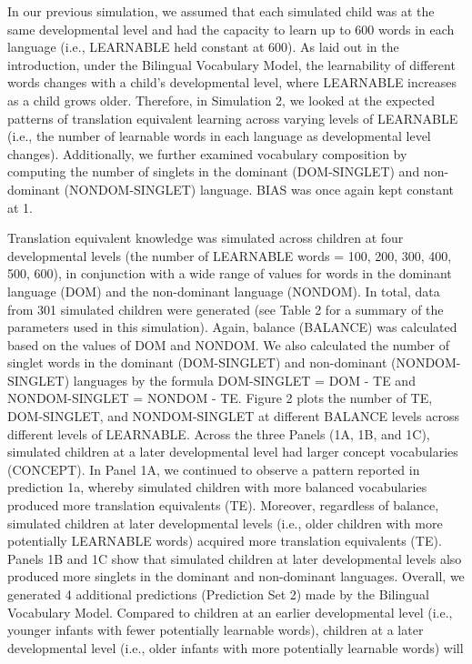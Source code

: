 \documentclass[
  english,
  ,man,floatsintext]{apa6}
\begin{document}
In our previous simulation, we assumed that each simulated child was at the same developmental level and had the capacity to learn up to 600 words in each language (i.e., LEARNABLE held constant at 600). As laid out in the introduction, under the Bilingual Vocabulary Model, the learnability of different words changes with a child's developmental level, where LEARNABLE increases as a child grows older. Therefore, in Simulation 2, we looked at the expected patterns of translation equivalent learning across varying levels of LEARNABLE (i.e., the number of learnable words in each language as developmental level changes). Additionally, we further examined vocabulary composition by computing the number of singlets in the dominant (DOM-SINGLET) and non-dominant (NONDOM-SINGLET) language. BIAS was once again kept constant at 1.

Translation equivalent knowledge was simulated across children at four developmental levels (the number of LEARNABLE words = 100, 200, 300, 400, 500, 600), in conjunction with a wide range of values for words in the dominant language (DOM) and the non-dominant language (NONDOM). In total, data from 301 simulated children were generated (see Table 2 for a summary of the parameters used in this simulation). Again, balance (BALANCE) was calculated based on the values of DOM and NONDOM. We also calculated the number of singlet words in the dominant (DOM-SINGLET) and non-dominant (NONDOM-SINGLET) languages by the formula DOM-SINGLET = DOM - TE and NONDOM-SINGLET = NONDOM - TE. Figure 2 plots the number of TE, DOM-SINGLET, and NONDOM-SINGLET at different BALANCE levels across different levels of LEARNABLE. Across the three Panels (1A, 1B, and 1C), simulated children at a later developmental level had larger concept vocabularies (CONCEPT). In Panel 1A, we continued to observe a pattern reported in prediction 1a, whereby simulated children with more balanced vocabularies produced more translation equivalents (TE). Moreover, regardless of balance, simulated children at later developmental levels (i.e., older children with more potentially LEARNABLE words) acquired more translation equivalents (TE). Panels 1B and 1C show that simulated children at later developmental levels also produced more singlets in the dominant and non-dominant languages. Overall, we generated 4 additional predictions (Prediction Set 2) made by the Bilingual Vocabulary Model. Compared to children at an earlier developmental level (i.e., younger infants with fewer potentially learnable words), children at a later developmental level (i.e., older infants with more potentially learnable words) will
\end{document}
